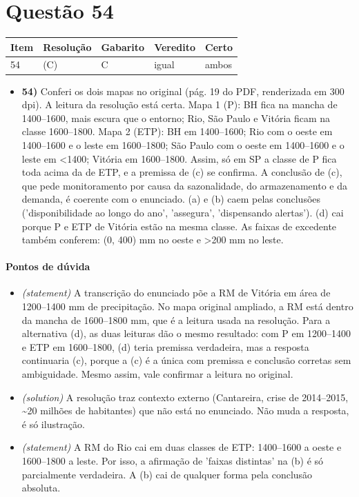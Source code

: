 \documentclass{article}%
\begin{document}
\section*{Questão 54}%
\begin{longtable}{@{}p{} p{} p{} p{} p{}@{}}\toprule Item & Resolução & Gabarito & Veredito & Certo \\ \midrule
54 & (C) & C & igual & ambos \\
\bottomrule\end{longtable}%
\begin{itemize}%
\item%
\textbf{54)} Conferi os dois mapas no original (pág. 19 do PDF, renderizada em 300 dpi). A leitura da resolução está certa. Mapa 1 (P): BH fica na mancha de 1400--1600, mais escura que o entorno; Rio, São Paulo e Vitória ficam na classe 1600--1800. Mapa 2 (ETP): BH em 1400--1600; Rio com o oeste em 1400--1600 e o leste em 1600--1800; São Paulo com o oeste em 1400--1600 e o leste em <1400; Vitória em 1600--1800. Assim, só em SP a classe de P fica toda acima da de ETP, e a premissa de (c) se confirma. A conclusão de (c), que pede monitoramento por causa da sazonalidade, do armazenamento e da demanda, é coerente com o enunciado. (a) e (b) caem pelas conclusões ('disponibilidade ao longo do ano', 'assegura', 'dispensando alertas'). (d) cai porque P e ETP de Vitória estão na mesma classe. As faixas de excedente também conferem: (0, 400) mm no oeste e >200 mm no leste.%
\end{itemize}%
\paragraph{Pontos de dúvida}%
\begin{itemize}%
\item%
\textit{(statement)} A transcrição do enunciado põe a RM de Vitória em área de 1200--1400 mm de precipitação. No mapa original ampliado, a RM está dentro da mancha de 1600--1800 mm, que é a leitura usada na resolução. Para a alternativa (d), as duas leituras dão o mesmo resultado: com P em 1200--1400 e ETP em 1600--1800, (d) teria premissa verdadeira, mas a resposta continuaria (c), porque a (c) é a única com premissa e conclusão corretas sem ambiguidade. Mesmo assim, vale confirmar a leitura no original.%
\item%
\textit{(solution)} A resolução traz contexto externo (Cantareira, crise de 2014--2015, \textasciitilde{}20 milhões de habitantes) que não está no enunciado. Não muda a resposta, é só ilustração.%
\item%
\textit{(statement)} A RM do Rio cai em duas classes de ETP: 1400--1600 a oeste e 1600--1800 a leste. Por isso, a afirmação de 'faixas distintas' na (b) é só parcialmente verdadeira. A (b) cai de qualquer forma pela conclusão absoluta.%
\end{itemize}%
\end{document}
